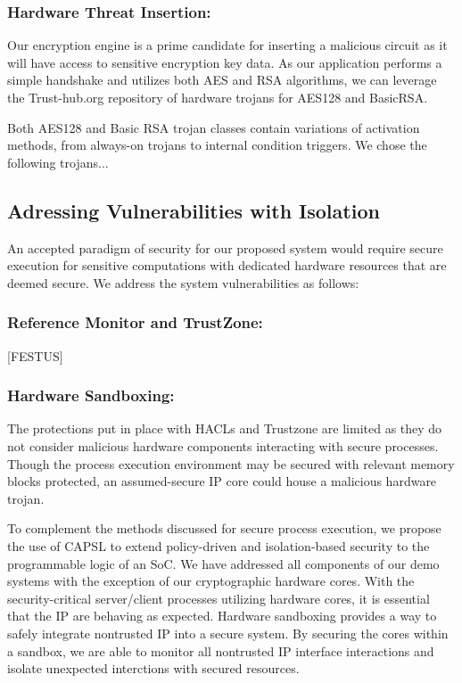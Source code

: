 \documentclass[sigconf]{acmart}
\theoremstyle{plain}
\theoremstyle{remark}
\begin{document}
\subsubsection{Hardware Threat Insertion:}

Our encryption engine is a prime candidate for inserting a malicious circuit as it will have access to sensitive encryption key data. As our application performs a simple handshake and utilizes both AES and RSA algorithms, we can leverage the Trust-hub.org repository of hardware trojans for AES128 and BasicRSA.

Both AES128 and Basic RSA trojan classes contain variations of activation methods, from always-on trojans to internal condition triggers. We chose the following trojans...


\subsection{Adressing Vulnerabilities with Isolation}
An accepted paradigm of security for our proposed system would require secure execution for sensitive computations with dedicated hardware resources that are deemed secure. We address the system vulnerabilities as follows:


\subsubsection{Reference Monitor and TrustZone:}
[FESTUS]

\subsubsection{Hardware Sandboxing:}
The protections put in place with HACLs and Trustzone are limited as they do not consider malicious hardware components interacting with secure processes. Though the process execution environment may be secured with relevant memory blocks protected, an assumed-secure IP core could house a malicious hardware trojan.

To complement the methods discussed for secure process execution, we propose the use of CAPSL to extend policy-driven and isolation-based security to the programmable logic of an SoC. We have addressed all components of our demo systems with the exception of our cryptographic hardware cores. With the security-critical server/client processes utilizing hardware cores, it is essential that the IP are behaving as expected. Hardware sandboxing provides a way to safely integrate nontrusted IP into a secure system. By securing the cores within a sandbox, we are able to monitor all nontrusted IP interface interactions and isolate unexpected interctions with secured resources.
\end{document}

